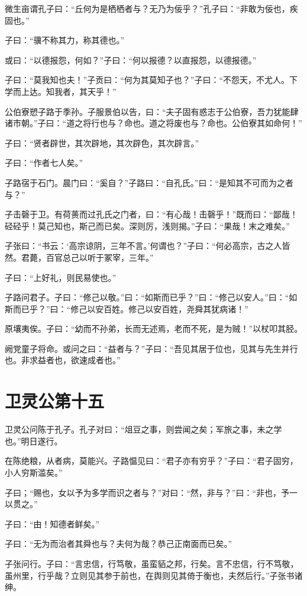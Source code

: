 \documentclass[twoside,openany]{book}
\begin{document}
微生亩谓孔子曰：“丘何为是栖栖者与？无乃为佞乎？”孔子曰：“非敢为佞也，疾固也。”

子曰：“骥不称其力，称其德也。”

或曰：“以德报怨，何如？”子曰：“何以报德？以直报怨，以德报德。”

子曰：“莫我知也夫！”子贡曰：“何为其莫知子也？”子曰：“不怨天，不尤人。下学而上达。知我者，其天乎！”

公伯寮愬子路于季孙。子服景伯以告，曰：“夫子固有惑志于公伯寮，吾力犹能肆诸市朝。”子曰：“道之将行也与？命也。道之将废也与？命也。公伯寮其如命何！”

子曰：“贤者辟世，其次辟地，其次辟色，其次辟言。”

子曰：“作者七人矣。”

子路宿于石门。晨门曰：“奚自？”子路曰：“自孔氏。”曰：“是知其不可而为之者与？”

子击磬于卫。有荷蒉而过孔氏之门者，曰：“有心哉！击磬乎！”既而曰：“鄙哉！硁硁乎！莫己知也，斯己而已矣。深则厉，浅则揭。”子曰：“果哉！末之难矣。”

子张曰：“书云：‘高宗谅阴，三年不言。’何谓也？”子曰：“何必高宗，古之人皆然。君薨，百官总己以听于冢宰，三年。”

子曰：“上好礼，则民易使也。”

子路问君子。子曰：“修己以敬。”曰：“如斯而已乎？”曰：“修己以安人。”曰：“如斯而已乎？”曰：“修己以安百姓。修己以安百姓，尧舜其犹病诸！”

原壤夷俟。子曰：“幼而不孙弟，长而无述焉，老而不死，是为贼！”以杖叩其胫。

阙党童子将命。或问之曰：“益者与？”子曰：“吾见其居于位也，见其与先生并行也。非求益者也，欲速成者也。” 

\chapter{卫灵公第十五}\label{ch15}

卫灵公问陈于孔子。孔子对曰：“俎豆之事，则尝闻之矣；军旅之事，未之学也。”明日遂行。

在陈绝粮，从者病，莫能兴。子路愠见曰：“君子亦有穷乎？”子曰：“君子固穷，小人穷斯滥矣。”

子曰；“赐也，女以予为多学而识之者与？”对曰：“然，非与？”曰：“非也，予一以贯之。”

子曰：“由！知德者鲜矣。”

子曰：“无为而治者其舜也与？夫何为哉？恭己正南面而已矣。”

子张问行。子曰：“言忠信，行笃敬，虽蛮貊之邦，行矣。言不忠信，行不笃敬，虽州里，行乎哉？立则见其参于前也，在舆则见其倚于衡也，夫然后行。”子张书诸绅。
\end{document}
